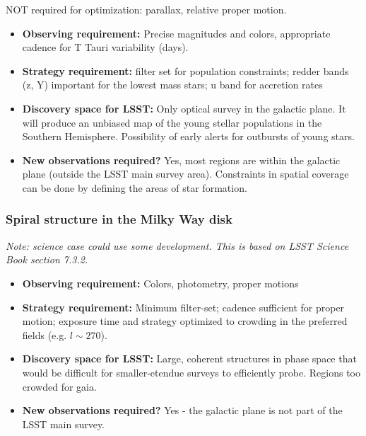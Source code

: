 NOT required for optimization: parallax, relative proper motion.

\begin{itemize}
\item {\bf Observing requirement:} Precise magnitudes and colors, appropriate cadence for T Tauri variability (days).

\vspace{-2mm}

\item {\bf Strategy requirement:} filter set for population constraints; redder bands (z, Y) important for the lowest mass stars; u band for accretion rates
\vspace{-2mm}

\item {\bf Discovery space for LSST:} Only optical survey in the galactic plane. It will produce an unbiased map of the young stellar populations in the Southern Hemisphere. Possibility of early alerts for outbursts of young stars.
\vspace{-2mm}

\item {\bf New observations required?} Yes, most regions are within the galactic plane (outside the LSST main survey area). Constraints in spatial coverage can be done by defining the areas of star formation.
\vspace{-2mm}
\end{itemize}

\subsubsection{Spiral structure in the Milky Way disk}

{\it Note: science case could use some development. This is based on LSST Science Book section 7.3.2.}

\begin{itemize}
\item {\bf Observing requirement:} Colors, photometry, proper motions
\vspace{-2mm}

\item {\bf Strategy requirement:} Minimum filter-set; cadence sufficient for proper motion; exposure time and strategy optimized to crowding in the preferred fields (e.g. $l \sim 270$).
\vspace{-2mm}

\item {\bf Discovery space for LSST:} Large, coherent structures in phase space that would be difficult for smaller-etendue surveys to efficiently probe. Regions too crowded for gaia.
\vspace{-2mm}

\item {\bf New observations required?} Yes - the galactic plane is not part of the LSST main survey.
\vspace{-2mm}
\end{itemize}


